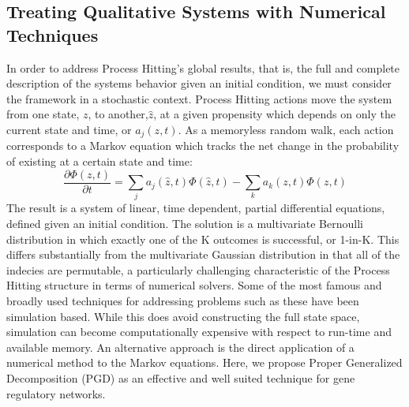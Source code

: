 \documentclass{article}
\begin{document}
\subsection{Treating Qualitative Systems with Numerical Techniques}

In order to address Process Hitting's global results, that is, the full and complete description of the systems behavior given an initial condition, we must consider the framework in a stochastic context. Process Hitting actions move the system from one state, $z$, to another,$\hat{z}$, at a given propensity which depends on only the current state and time, or $a_j(z,t)$. As a memoryless random walk, each action corresponds to a Markov equation which tracks the net change in the probability of existing at a certain state and time: 
\[
\frac{\partial \Phi(z,t)}{\partial t} = \sum_j  a_j(\hat{z},t)\Phi(\hat{z},t) -\sum_k a_k(z,t)\Phi(z,t)
\]
The result is a system of linear, time dependent, partial differential equations, defined given an initial condition. The solution is a multivariate Bernoulli distribution in which exactly one of the K outcomes is successful, or 1-in-K. This differs substantially from the multivariate Gaussian distribution in that all of the indecies are permutable, a particularly challenging characteristic of the Process Hitting structure in terms of numerical solvers. Some of the most famous and broadly used techniques for addressing problems such as these have been simulation based. While this does avoid constructing the full state space, simulation can become computationally expensive with respect to run-time and available memory. An alternative approach is the direct application of a numerical method to the Markov equations. Here, we propose Proper Generalized Decomposition (PGD) as an effective and well suited technique for gene regulatory networks.
\end{document}
